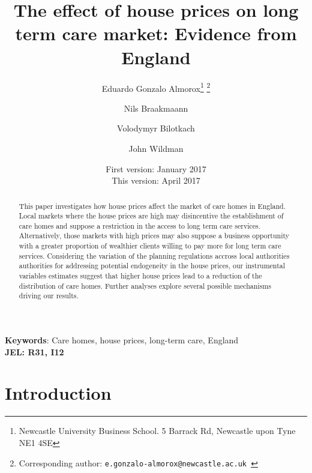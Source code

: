 \documentclass[12pt,letterpaper]{article}
\begin{document}
\title{\LARGE{The effect of house prices on long term care market: Evidence from England}}
\author{Eduardo Gonzalo Almorox\thanks{Newcastle University Business School. 5 Barrack Rd, Newcastle upon Tyne NE1 4SE} \thanks{Corresponding author: \tt{e.gonzalo-almorox@newcastle.ac.uk} } \and Nils Braakmaann\footnotemark[1]
 \and Volodymyr Bilotkach\footnotemark[1] \and John Wildman\footnotemark[1]}


\date{First version: January 2017\\ This version: April 2017}
\maketitle

\begin{abstract}
This paper investigates how house prices affect the market of care homes in 
England. Local markets where the house prices are high may disincentive the establishment of care homes 
and suppose a restriction in the access to long term care services. Alternatively, 
 those markets with high prices may also suppose a business opportunity with a greater proportion of wealthier clients willing to 
 pay more for long term care services. Considering the variation of the planning regulations accross 
 local authorities authorities for addressing
 potential endogeneity in the house prices, our instrumental variables estimates suggest that higher house prices lead to a reduction of 
 the distribution of care homes. Further analyses explore several possible mechanisms driving 
 our results. 

\end{abstract}

{{\bf{Keywords}}: Care homes, house prices, long-term care, England\\
\bf{JEL}: R31, I12}



\newpage
\section{Introduction}
\label{sec: intro}
\end{document}
